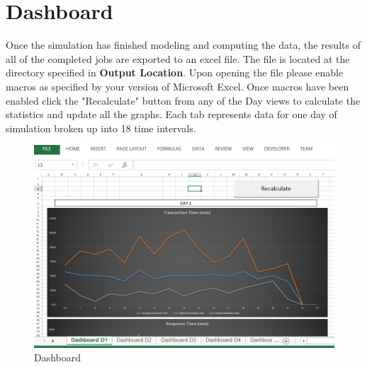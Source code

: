 \documentclass[paper=letter, fontsize=10pt]{scrartcl}
\numberwithin{equation}{section}		%
\numberwithin{figure}{section}			%
\numberwithin{table}{section}				%
\begin{document}
\section{Dashboard}
Once the simulation has finished modeling and computing the data, the results of all of the completed jobs are exported to an excel file. The file is located at the directory specified in \textbf{Output Location}. Upon opening the file please enable macros as specified by your version of Microsoft Excel. Once macros have been enabled click the "Recalculate" button from any of the Day views to calculate the statistics and update all the graphs. Each tab represents data for one day of simulation broken up into 18 time intervals.

	\begin{figure}[!htbp]
	\begin{center}
		\includegraphics[width=1\columnwidth, height=0.5\textheight, keepaspectratio]{Dashboard.png}
		\caption{Dashboard}
	\end{center}
	\end{figure}
	
\end{document}
